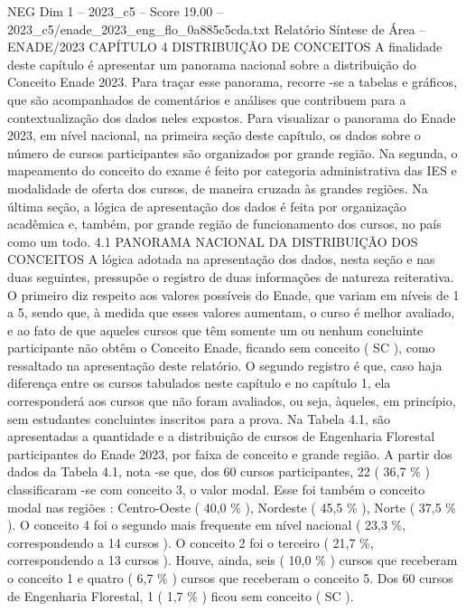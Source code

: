 \begin{textsample}{NEG Dim 1 – 2023\_c5 – Score 19.00 – 2023\_c5/enade\_2023\_eng\_flo\_0a885c5cda.txt}  \label{ex:f1_neg_421}
Relatório Síntese de Área – ENADE/2023 CAPÍTULO 4 DISTRIBUIÇÃO DE CONCEITOS A finalidade deste capítulo é apresentar um panorama nacional sobre a distribuição do Conceito Enade 2023.
Para traçar esse panorama, recorre -se a tabelas e gráficos, que são acompanhados de comentários e análises que contribuem para a contextualização dos dados neles expostos.
Para visualizar o panorama do Enade 2023, em nível nacional, na primeira seção deste capítulo, os dados sobre o número de cursos participantes são organizados por grande região.
Na segunda, o mapeamento do conceito do exame é feito por categoria administrativa das IES e modalidade de oferta dos cursos, de maneira cruzada às grandes regiões.
Na última seção, a lógica de apresentação dos dados é feita por organização acadêmica e, também, por grande região de funcionamento dos cursos, no país como um todo. 4.1 PANORAMA NACIONAL DA DISTRIBUIÇÃO DOS CONCEITOS A lógica adotada na apresentação dos dados, nesta seção e nas duas seguintes, pressupõe o registro de duas informações de natureza reiterativa.
O primeiro diz respeito aos valores possíveis do Enade, que variam em níveis de 1 a 5, sendo que, à medida que esses valores aumentam, o curso é melhor avaliado, e ao fato de que aqueles cursos que têm somente um ou nenhum concluinte participante não obtêm o Conceito Enade, ficando sem conceito ( SC ), como ressaltado na apresentação deste relatório.
O segundo registro é que, caso haja diferença entre os cursos tabulados neste capítulo e no capítulo 1, ela corresponderá aos cursos que não foram avaliados, ou seja, àqueles, em princípio, sem estudantes concluintes inscritos para a prova.
Na Tabela 4.1, são apresentadas a quantidade e a distribuição de cursos de Engenharia Florestal participantes do Enade 2023, por faixa de conceito e grande região.
A partir dos dados da Tabela 4.1, nota -se que, dos 60 cursos participantes, 22 ( 36,7 \% ) classificaram -se com conceito 3, o valor modal.
Esse foi também o conceito modal nas regiões : Centro-Oeste ( 40,0 \% ), Nordeste ( 45,5 \% ), Norte ( 37,5 \% ).
O conceito 4 foi o segundo mais frequente em nível nacional ( 23,3 \%, correspondendo a 14 cursos ).
O conceito 2 foi o terceiro ( 21,7 \%, correspondendo a 13 cursos ).
Houve, ainda, seis ( 10,0 \% ) cursos que receberam o conceito 1 e quatro ( 6,7 \% ) cursos que receberam o conceito 5.
Dos 60 cursos de Engenharia Florestal, 1 ( 1,7 \% ) ficou sem conceito ( SC ).

\end{textsample}
